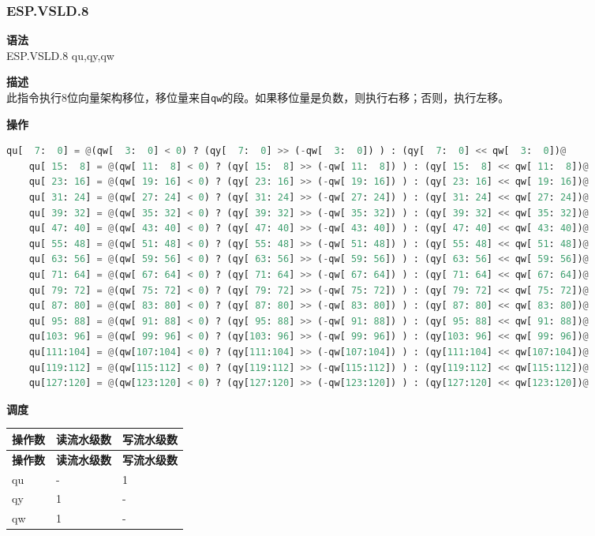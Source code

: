 \newpage
\subsubsection{ESP.VSLD.8}\label{instruction:ESPVSLD8}
\textbf{语法}\\
ESP.VSLD.8 qu,qy,qw

\textbf{描述}\\
此指令执行8位向量架构移位，移位量来自\lstinline{qw}的段。如果移位量是负数，则执行右移；否则，执行左移。

\textbf{操作}\\
\begin{lstlisting}[language=Python, escapechar=@]
    qu[  7:  0] = @(qw[  3:  0] < 0) ? (qy[  7:  0] >> (-qw[  3:  0]) ) : (qy[  7:  0] << qw[  3:  0])@
    qu[ 15:  8] = @(qw[ 11:  8] < 0) ? (qy[ 15:  8] >> (-qw[ 11:  8]) ) : (qy[ 15:  8] << qw[ 11:  8])@
    qu[ 23: 16] = @(qw[ 19: 16] < 0) ? (qy[ 23: 16] >> (-qw[ 19: 16]) ) : (qy[ 23: 16] << qw[ 19: 16])@
    qu[ 31: 24] = @(qw[ 27: 24] < 0) ? (qy[ 31: 24] >> (-qw[ 27: 24]) ) : (qy[ 31: 24] << qw[ 27: 24])@
    qu[ 39: 32] = @(qw[ 35: 32] < 0) ? (qy[ 39: 32] >> (-qw[ 35: 32]) ) : (qy[ 39: 32] << qw[ 35: 32])@
    qu[ 47: 40] = @(qw[ 43: 40] < 0) ? (qy[ 47: 40] >> (-qw[ 43: 40]) ) : (qy[ 47: 40] << qw[ 43: 40])@
    qu[ 55: 48] = @(qw[ 51: 48] < 0) ? (qy[ 55: 48] >> (-qw[ 51: 48]) ) : (qy[ 55: 48] << qw[ 51: 48])@
    qu[ 63: 56] = @(qw[ 59: 56] < 0) ? (qy[ 63: 56] >> (-qw[ 59: 56]) ) : (qy[ 63: 56] << qw[ 59: 56])@
    qu[ 71: 64] = @(qw[ 67: 64] < 0) ? (qy[ 71: 64] >> (-qw[ 67: 64]) ) : (qy[ 71: 64] << qw[ 67: 64])@
    qu[ 79: 72] = @(qw[ 75: 72] < 0) ? (qy[ 79: 72] >> (-qw[ 75: 72]) ) : (qy[ 79: 72] << qw[ 75: 72])@
    qu[ 87: 80] = @(qw[ 83: 80] < 0) ? (qy[ 87: 80] >> (-qw[ 83: 80]) ) : (qy[ 87: 80] << qw[ 83: 80])@
    qu[ 95: 88] = @(qw[ 91: 88] < 0) ? (qy[ 95: 88] >> (-qw[ 91: 88]) ) : (qy[ 95: 88] << qw[ 91: 88])@
    qu[103: 96] = @(qw[ 99: 96] < 0) ? (qy[103: 96] >> (-qw[ 99: 96]) ) : (qy[103: 96] << qw[ 99: 96])@
    qu[111:104] = @(qw[107:104] < 0) ? (qy[111:104] >> (-qw[107:104]) ) : (qy[111:104] << qw[107:104])@
    qu[119:112] = @(qw[115:112] < 0) ? (qy[119:112] >> (-qw[115:112]) ) : (qy[119:112] << qw[115:112])@
    qu[127:120] = @(qw[123:120] < 0) ? (qy[127:120] >> (-qw[123:120]) ) : (qy[127:120] << qw[123:120])@
\end{lstlisting}

\textbf{调度}\\
\begin{longtable}[c]{|l|l|l|}
    \hline
    \rowcolor{lightgray}
    \textbf{操作数} & \textbf{读流水级数} & \textbf{写流水级数} \\\hline
    \endfirsthead
    \hline
    \rowcolor{lightgray}
     \textbf{操作数} & \textbf{读流水级数} & \textbf{写流水级数} \\\hline
    \endhead
    \hline
    \endfoot

  qu & - & 1 \\\hline
  qy & 1 & - \\\hline
  qw & 1 & -

\end{longtable}

